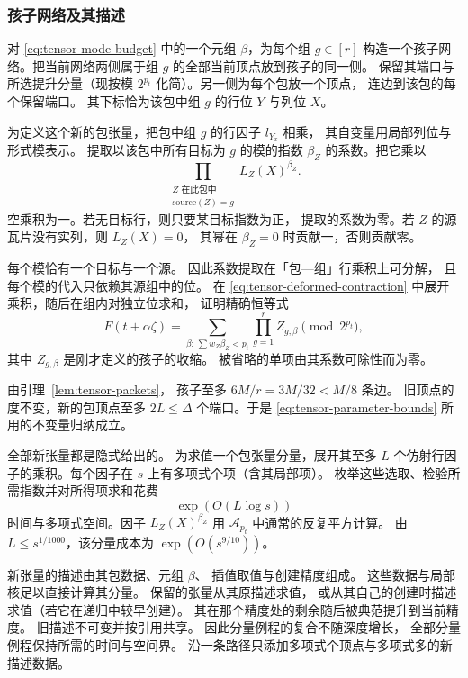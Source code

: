 \subsubsection{孩子网络及其描述}
\label{subsec:tensor-children}

对 \eqref{eq:tensor-mode-budget} 中的一个元组
$\beta$，为每个组 $g\in[r]$
构造一个孩子网络。把当前网络两侧属于组 $g$
的全部当前顶点放到孩子的同一侧。
保留其端口与所选提升分量（现按模 $2^{p_t}$
化简）。另一侧为每个包放一个顶点，
连边到该包的每个保留端口。
其下标恰为该包中组 $g$ 的行位 $Y$
与列位 $X$。

为定义这个新的包张量，把包中组 $g$
的行因子 $l_{Y_x}$ 相乘，
其自变量用局部列位与形式模表示。
提取以该包中所有目标为 $g$ 的模的指数 $\beta_Z$
的系数。把它乘以
\[
 \prod_{\substack{Z\text{ 在此包中}\\
                  \text{source}(Z)=g}}L_Z(X)^{\beta_Z}.
\]
空乘积为一。若无目标行，则只要某目标指数为正，
提取的系数为零。若 $Z$
的源瓦片没有实列，则 $L_Z(X)=0$，
其幂在 $\beta_Z=0$ 时贡献一，否则贡献零。

每个模恰有一个目标与一个源。
因此系数提取在「包—组」行乘积上可分解，
且每个模的代入只依赖其源组中的位。
在 \eqref{eq:tensor-deformed-contraction}
中展开乘积，随后在组内对独立位求和，
证明精确恒等式
\begin{equation}\label{eq:tensor-recursion-identity}
 F(t+\alpha\zeta)
   =\sum_{\beta:\,\sum w_Z\beta_Z<p_t}
                       \prod_{g=1}^r Z_{g,\beta}
                  \pmod {2^{p_t}},
\end{equation}
其中 $Z_{g,\beta}$ 是刚才定义的孩子的收缩。
被省略的单项由其系数可除性而为零。

由引理~\ref{lem:tensor-packets}，
孩子至多 $6M/r=3M/32<M/8$ 条边。
旧顶点的度不变，新的包顶点至多 $2L\le\Delta$
个端口。于是 \eqref{eq:tensor-parameter-bounds}
所用的不变量归纳成立。

全部新张量都是隐式给出的。
为求值一个包张量分量，展开其至多 $L$
个仿射行因子的乘积。每个因子在 $s$
上有多项式个项（含其局部项）。
枚举这些选取、检验所需指数并对所得项求和花费
\[
 \exp(O(L\log s))
\]
时间与多项式空间。因子 $L_Z(X)^{\beta_Z}$
用 $\mathcal A_{p_t}$ 中通常的反复平方计算。
由 $L\le s^{1/1000}$，该分量成本为
$\exp(O(s^{9/10}))$。

新张量的描述由其包数据、元组 $\beta$、
插值取值与创建精度组成。
这些数据与局部核足以直接计算其分量。
保留的张量从其原描述求值，
或从其自己的创建时描述求值（若它在递归中较早创建）。
其在那个精度处的剩余随后被典范提升到当前精度。
旧描述不可变并按引用共享。
因此分量例程的复合不随深度增长，
全部分量例程保持所需的时间与空间界。
沿一条路径只添加多项式个顶点与多项式多的新描述数据。


